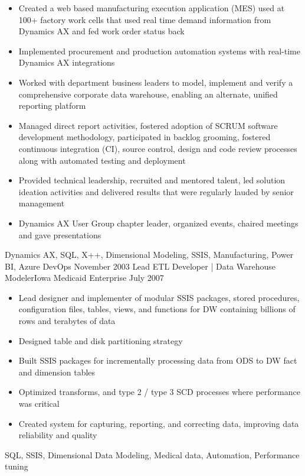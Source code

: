 \begin{experiences}
{\begin{itemize}
\item Created a web based manufacturing execution application (MES) used at 100+ factory work cells that used real time demand information from Dynamics AX and fed work order status back
\item Implemented procurement and production automation systems with real-time Dynamics AX integrations 
\item Worked with department business leaders to model, implement and verify a comprehensive corporate data warehouse, enabling an alternate, unified reporting platform
\item Managed direct report activities, fostered adoption of SCRUM software development methodology, participated in backlog grooming, fostered continuous integration (CI), source control, design and code review processes along with automated testing and deployment
\item Provided technical leadership, recruited and mentored talent, led solution ideation activities and delivered results that were regularly lauded by senior management
\item Dynamics AX User Group chapter leader, organized events, chaired meetings and gave presentations
                      \end{itemize}
                    }
                    {Dynamics AX, SQL, X++, Dimensional Modeling, SSIS, Manufacturing, Power BI, Azure DevOps}
  \emptySeparator
  \experience
    {November 2003}     {Lead ETL Developer | Data Warehouse Modeler}{Iowa Medicaid Enterprise}{}
    {July 2007}    {
                      \begin{itemize}
                        \item Lead designer and implementer of modular SSIS packages, stored procedures, configuration files, tables, views, and functions for DW containing billions of rows and terabytes of data
                        \item Designed table and disk partitioning strategy
                        \item Built SSIS packages for incrementally processing data from ODS to DW fact and dimension tables
                        \item Optimized transforms, and type 2 / type 3 SCD processes where performance was critical
                        \item Created system for capturing, reporting, and correcting data, improving data reliability and quality
                      \end{itemize}
                    }
                    {SQL, SSIS, Dimensional Data Modeling, Medical data, Automation, Performance tuning}
                    
\end{experiences}

